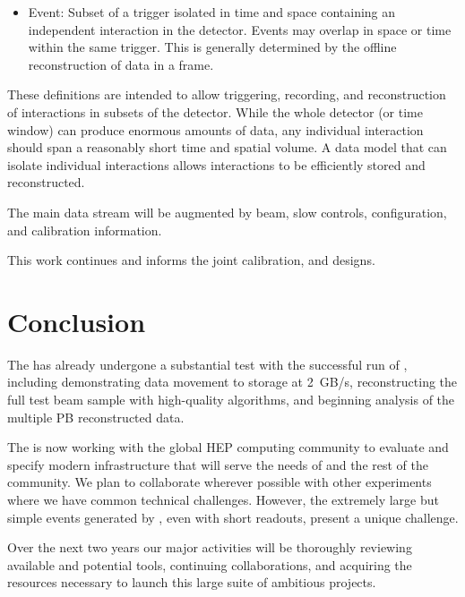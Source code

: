 {\begin{itemize}
\item{Event:} Subset of a trigger isolated in time and space containing an independent interaction in the detector. Events may overlap in space or time within the same trigger. This is generally determined by the offline reconstruction of data in a frame.

\end{itemize}

These definitions are intended to allow triggering, recording, and reconstruction of interactions in subsets of the detector. While the whole detector (or time window) can produce enormous amounts of data, any individual interaction should span a reasonably short time and spatial volume. A data model that can isolate individual interactions  allows interactions to be efficiently stored and reconstructed. 


The main data stream will be augmented by beam, slow controls,  configuration, and calibration information. 

This work continues and informs  the  joint  calibration,  and  designs.

}


\section{Conclusion}

The   has already undergone a substantial test with the successful run of , including demonstrating data movement to storage at \SI{2}{GB/s}, reconstructing the full test beam sample with high-quality algorithms, and beginning analysis of the multiple PB reconstructed data. 

The  is now working with the global HEP computing community to evaluate and specify modern infrastructure that will serve the needs of  and the rest of the community.  We plan to collaborate wherever possible with other experiments where we have common technical challenges. However, the extremely large but simple events generated by  , even with short readouts, present a unique challenge. 

Over the next two years our major activities  will be  thoroughly reviewing available and potential tools, continuing collaborations, and acquiring the resources necessary to launch this large suite of ambitious projects. 

